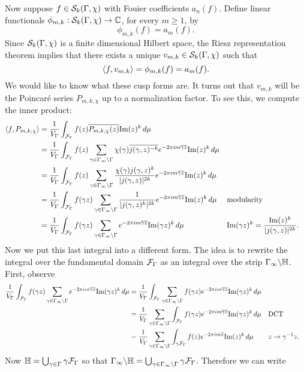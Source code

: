       Now suppose $f \in \mathcal{S}_{k}(\Gamma,\chi)$ with Fouier coefficients $a_{n}(f)$. Define linear functionals $\phi_{m,k}:\mathcal{S}_{k}(\Gamma,\chi) \to \mathbb{C}$, for every $m \ge 1$, by
      \[
        \phi_{m,k}(f) = a_{m}(f).
      \]
      Since $\mathcal{S}_{k}(\Gamma,\chi)$ is a finite dimensional Hilbert space, the Riesz representation theorem implies that there exists a unique $v_{m,k} \in \mathcal{S}_{k}(\Gamma,\chi)$ such that
      \[
        \langle f,v_{m,k}\rangle = \phi_{m,k}(f) = a_{m}(f).
      \]
      We would like to know what these cusp forms are. It turns out that $v_{m,k}$ will be the Poincar\'e series $P_{m,k,\chi}$ up to a normalization factor. To see this, we compute the inner product:
      \begin{align*}
        \langle f,P_{m,k,\chi}\rangle &= \frac{1}{V_{\Gamma}}\int_{\mathcal{F}_{\Gamma}}f(z)\overline{P_{m,k,\chi}(z)}\mathrm{Im}(z)^{k}\,d\mu \\
        &= \frac{1}{V_{\Gamma}}\int_{\mathcal{F}_{\Gamma}}f(z)\sum_{\gamma \in \Gamma_{\infty}\backslash\Gamma}\chi(\gamma)\overline{j(\gamma,z)^{-k}}e^{-2\pi im\overline{\gamma z}}\mathrm{Im}(z)^{k}\,d\mu \\
        &= \frac{1}{V_{\Gamma}}\int_{\mathcal{F}_{\Gamma}}f(z)\sum_{\gamma \in \Gamma_{\infty}\backslash\Gamma}\frac{\chi(\gamma)j(\gamma,z)^{k}}{|j(\gamma,z)|^{2k}}e^{-2\pi im\overline{\gamma z}}\mathrm{Im}(z)^{k}\,d\mu \\
        &= \frac{1}{V_{\Gamma}}\int_{\mathcal{F}_{\Gamma}}f(\gamma z)\sum_{\gamma \in \Gamma_{\infty}\backslash\Gamma}\frac{1}{|j(\gamma,z)^{k}|^{2k}}e^{-2\pi im\overline{\gamma z}}\mathrm{Im}(z)^{k}\,d\mu && \text{modularity} \\
        &= \frac{1}{V_{\Gamma}}\int_{\mathcal{F}_{\Gamma}}f(\gamma z)\sum_{\gamma \in \Gamma_{\infty}\backslash\Gamma}e^{-2\pi im\overline{\gamma z}}\mathrm{Im}(\gamma z)^{k}\,d\mu && \text{$\mathrm{Im}(\gamma z)^{k} = \frac{\mathrm{Im}(z)^{k}}{|j(\gamma,z)|^{2k}}$.}
      \end{align*}
      Now we put this last integral into a different form. The idea is to rewrite the integral over the fundamental domain $\mathcal{F}_{\Gamma}$ as an integral over the strip $\Gamma_{\infty}\backslash\mathbb{H}$. First, observe
      \begin{align*}
        \frac{1}{V_{\Gamma}}\int_{\mathcal{F}_{\Gamma}}f(\gamma z)\sum_{\gamma \in \Gamma_{\infty}\backslash\Gamma}e^{-2\pi im\overline{\gamma z}}\mathrm{Im}(\gamma z)^{k}\,d\mu &= \frac{1}{V_{\Gamma}}\int_{\mathcal{F}_{\Gamma}}\sum_{\gamma \in \Gamma_{\infty}\backslash\Gamma}f(\gamma z)e^{-2\pi im\overline{\gamma z}}\mathrm{Im}(\gamma z)^{k}\,d\mu \\
        &= \frac{1}{V_{\Gamma}}\sum_{\gamma \in \Gamma_{\infty}\backslash\Gamma}\int_{\mathcal{F}_{\Gamma}}f(\gamma z)e^{-2\pi im\overline{\gamma z}}\mathrm{Im}(\gamma z)^{k}\,d\mu && \text{DCT} \\
        &= \frac{1}{V_{\Gamma}}\sum_{\gamma \in \Gamma_{\infty}\backslash\Gamma}\int_{\gamma\mathcal{F}_{\Gamma}}f(z)e^{-2\pi im\overline{z}}\mathrm{Im}(z)^{k}\,d\mu && \text{$z \to \gamma^{-1}z$.}
      \end{align*}
      Now $\mathbb{H} = \bigcup_{\gamma \in \Gamma}\gamma\mathcal{F}_{\Gamma}$ so that $\Gamma_{\infty}\backslash\mathbb{H} = \bigcup_{\gamma \in \Gamma_{\infty}\backslash\Gamma}\gamma\mathcal{F}_{\Gamma}$. Therefore we can write

